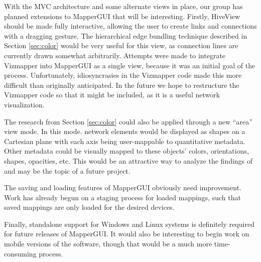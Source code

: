 With the MVC architecture and some alternate views in place, our group has planned extensions to MapperGUI that will be interesting. Firstly, HiveView should be made fully interactive, allowing the user to create links and connections with a dragging gesture. The hierarchical edge bundling technique described in Section \ref{sec:color} would be very useful for this view, as connection lines are currently drawn somewhat arbitrarily. Attempts were made to integrate Vizmapper into MapperGUI as a single view, because it was an initial goal of the process. Unfortunately, idiosyncrasies in the Vizmapper code made this more difficult than originally anticipated. In the future we hope to restructure the Vizmapper code so that it might be included, as it is a useful network visualization. 

The research from Section \ref{sec:color} could also be applied through a new ``area'' view mode. In this mode. network elements would be displayed as shapes on a Cartesian plane with each axis being user-mappable to quantitative metadata. Other metadata could be visually mapped to these objects' colors, orientations, shapes, opacities, etc. This would be an attractive way to analyze the findings of  and may be the topic of a future project. 

The saving and loading features of MapperGUI obviously need improvement. Work has already begun on a staging process for loaded mappings, such that saved mappings are only loaded for the desired devices. 

Finally, standalone support for Windows and Linux systems is definitely required for future releases of MapperGUI. It would also be interesting to begin work on mobile versions of the software, though that would be a much more time-consuming process. 



	